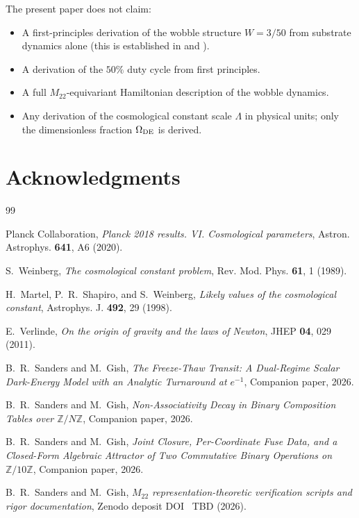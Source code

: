 \documentclass[11pt,reqno]{amsart}
\theoremstyle{plain}
\theoremstyle{definition}
\theoremstyle{remark}
\newcommand{\Mtwentytwo}{M_{22}}
\newcommand{\OmegaDE}{\Omega_{\rm DE}}
\begin{document}
The present paper does not claim:
\begin{itemize}
\item A first-principles derivation of the wobble structure $W = 3/50$
      from substrate dynamics alone (this is established in
      \cite{SandersGishSigma} and \cite{SandersGishFourCore}).
\item A derivation of the $50\%$ duty cycle from first principles.
\item A full $\Mtwentytwo$-equivariant Hamiltonian description of
      the wobble dynamics.
\item Any derivation of the cosmological constant scale $\Lambda$ in
      physical units; only the dimensionless fraction $\OmegaDE$ is
      derived.
\end{itemize}

\section*{Acknowledgments}


\begin{thebibliography}{99}

Planck Collaboration, \emph{Planck 2018 results. VI. Cosmological
parameters}, Astron. Astrophys. \textbf{641}, A6 (2020).

S.~Weinberg, \emph{The cosmological constant problem}, Rev. Mod. Phys.
\textbf{61}, 1 (1989).

H.~Martel, P.~R.~Shapiro, and S.~Weinberg, \emph{Likely values of
the cosmological constant}, Astrophys. J. \textbf{492}, 29 (1998).

E.~Verlinde, \emph{On the origin of gravity and the laws of Newton},
JHEP \textbf{04}, 029 (2011).

B.~R.~Sanders and M.~Gish, \emph{The Freeze-Thaw Transit: A Dual-Regime
Scalar Dark-Energy Model with an Analytic Turnaround at $e^{-1}$},
Companion paper, 2026.

B.~R.~Sanders and M.~Gish, \emph{Non-Associativity Decay in Binary
Composition Tables over $\mathbb{Z}/N\mathbb{Z}$}, Companion paper, 2026.

B.~R.~Sanders and M.~Gish, \emph{Joint Closure, Per-Coordinate Fuse Data,
and a Closed-Form Algebraic Attractor of Two Commutative Binary
Operations on $\mathbb{Z}/10\mathbb{Z}$}, Companion paper, 2026.

B.~R.~Sanders and M.~Gish, \emph{$\Mtwentytwo$ representation-theoretic
verification scripts and rigor documentation}, Zenodo deposit DOI~%
TBD (2026).


\end{thebibliography}
\end{document}
